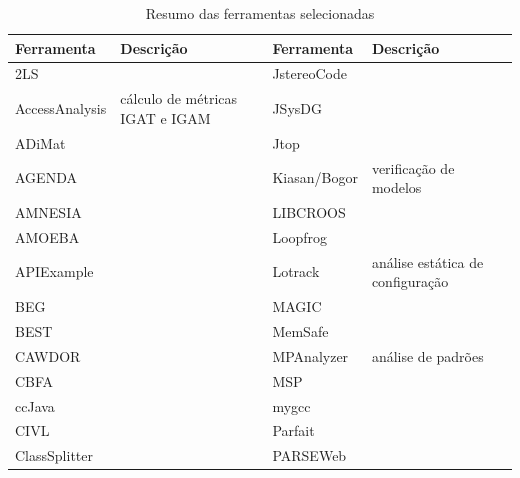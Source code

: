 \begin{table}[H]
{\scriptsize
\caption{Resumo das ferramentas selecionadas}
\centering
\begin{tabular}{| l | l | l | l |}
  \hline
  Ferramenta          & Descrição                        & Ferramenta          & Descrição                            \\
  \hline
  2LS                 &                                  & JstereoCode         &                                      \\
  AccessAnalysis      & cálculo de métricas IGAT e IGAM  & JSysDG              &                                      \\
  ADiMat              &                                  & Jtop                &                                      \\
  AGENDA              &                                  & Kiasan/Bogor        & verificação de modelos               \\
  AMNESIA             &                                  & LIBCROOS            &                                      \\
  AMOEBA              &                                  & Loopfrog            &                                      \\
  APIExample          &                                  & Lotrack             & análise estática de configuração     \\
  BEG                 &                                  & MAGIC               &                                      \\
  BEST                &                                  & MemSafe             &                                      \\
  CAWDOR              &                                  & MPAnalyzer          & análise de padrões                   \\
  CBFA                &                                  & MSP                 &                                      \\
  ccJava              &                                  & mygcc               &                                      \\
  CIVL                &                                  & Parfait             &                                      \\
  ClassSplitter       &                                  & PARSEWeb            &                                      \\

\end{tabular}}
\end{table}
